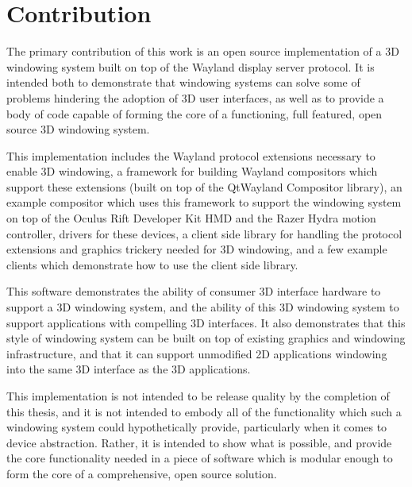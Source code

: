 \chapter{Contribution}
The primary contribution of this work is an open source implementation of a 3D windowing system built on top of the Wayland display server protocol. It is intended both to demonstrate that windowing systems can solve some of problems hindering the adoption of 3D user interfaces, as well as to provide a body of code capable of forming the core of a functioning, full featured, open source 3D windowing system. 
	
This implementation includes the Wayland protocol extensions necessary to enable 3D windowing, a framework for building Wayland compositors which support these extensions (built on top of the QtWayland Compositor library), an example compositor which uses this framework to support the windowing system on top of the Oculus Rift Developer Kit HMD and the Razer Hydra motion controller, drivers for these devices, a client side library for handling the protocol extensions and graphics trickery needed for 3D windowing, and a few example clients which  demonstrate how to use the client side library. 

This software demonstrates the ability of consumer 3D interface hardware to support a 3D windowing system, and the ability of this 3D windowing system to support applications with compelling 3D interfaces. It also demonstrates that this style of windowing system can be built on top of existing graphics and windowing infrastructure, and that it can support unmodified 2D applications windowing into the same 3D interface as the 3D applications. 

This implementation is not intended to be release quality by the completion of this thesis, and it is not intended to embody all of the functionality which such a windowing system could hypothetically provide, particularly when it comes to device abstraction. Rather, it is intended to show what is possible, and provide the core functionality needed in a piece of software which is modular enough to form the core of a comprehensive, open source solution. 
